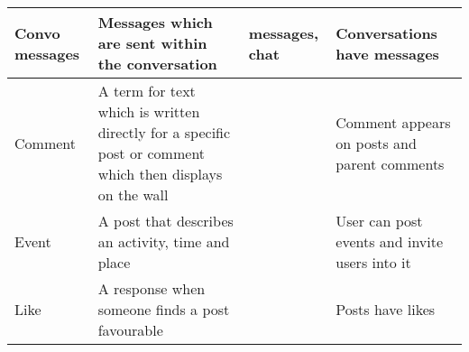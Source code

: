 \begin{center}
\begin{tabular}{| l | l | l | l |}
    Convo messages   & Messages which are sent within the conversation                                        & messages, chat                              &  Conversations have messages       \\ \hline
    Comment          & A term for text which is written directly for a specific post or comment which then displays on the wall &                                     & Comment appears on posts and parent comments  \\ \hline 
    Event            & A post that describes an activity, time and place                                                        &                                     & User can post events and invite users into it \\ \hline
    Like             & A response when someone finds a post favourable                                                          &                                     & Posts have likes                              \\ \hline
    \hline
    \end{tabular}
\end{center}


